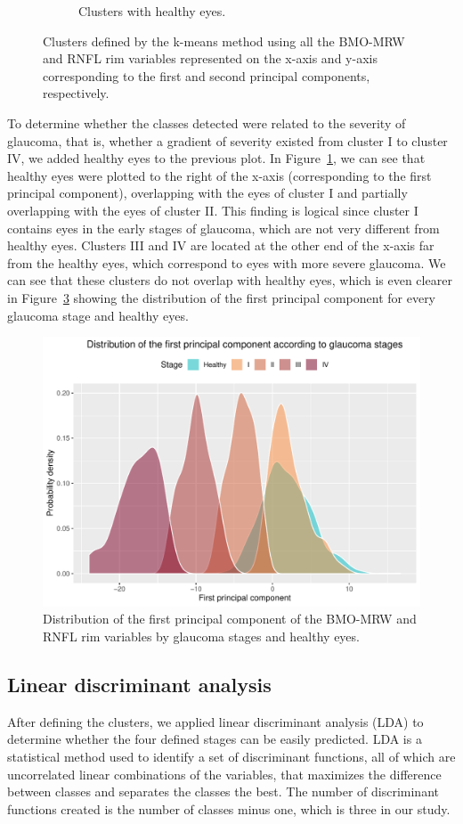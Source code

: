 \documentclass[fleqn,10pt]{wlscirep}
\begin{document}
\begin{figure}
\begin{subfigure}[b]{0.49\textwidth}
\caption{Clusters with healthy eyes.}
\label{fig:clusters-with-healthy-eyes}
\end{subfigure}
\caption{Clusters defined by the k-means method using all the BMO-MRW and RNFL rim variables represented on the x-axis and y-axis corresponding to the first and second principal components, respectively.}
\label{fig:clusters}
\end{figure}

To determine whether the classes detected were related to the severity of glaucoma, that is, whether a gradient of severity existed from cluster I to cluster IV, we added healthy eyes to the previous plot. In Figure~\ref{fig:clusters-with-healthy-eyes}, we can see that healthy eyes were plotted to the right of the x-axis (corresponding to the first principal component), overlapping with the eyes of cluster I and partially overlapping with the eyes of cluster II. This finding is logical since cluster I contains eyes in the early stages of glaucoma, which are not very different from healthy eyes. Clusters III and IV are located at the other end of the x-axis far from the healthy eyes, which correspond to eyes with more severe glaucoma. We can see that these clusters do not overlap with healthy eyes, which is even clearer in Figure~\ref{fig:clusters-distributions} showing the distribution of the first principal component for every glaucoma stage and healthy eyes.

\begin{figure}[ht]
\centering
\includegraphics[width=0.5\linewidth]{img/clusters-distributions.pdf}
\caption{Distribution of the first principal component of the BMO-MRW and RNFL rim variables by glaucoma stages and healthy eyes.}
\label{fig:clusters-distributions}
\end{figure}

\subsection*{Linear discriminant analysis}

After defining the clusters, we applied linear discriminant analysis (LDA) to determine whether the four defined stages can be easily predicted. LDA is a statistical method used to identify a set of discriminant functions, all of which are uncorrelated linear combinations of the variables, that maximizes the difference between classes and separates the classes the best\cite{hassel:2009:}. The number of discriminant functions created is the number of classes minus one, which is three in our study.
\end{document}
